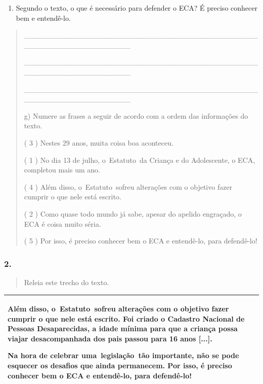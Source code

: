 \begin{enumerate}
\def\labelenumi{\alph{enumi})}
\item
  Segundo o texto, o que é necessário para defender o ECA? É preciso
  conhecer bem e entendê-lo.
\end{enumerate}

\begin{quote}
\_\_\_\_\_\_\_\_\_\_\_\_\_\_\_\_\_\_\_\_\_\_\_\_\_\_\_\_\_\_\_\_\_\_\_\_\_\_\_\_\_\_\_\_\_\_\_\_\_\_\_\_\_\_\_\_\_\_\_\_\_\_\_\_

\_\_\_\_\_\_\_\_\_\_\_\_\_\_\_\_\_\_\_\_\_\_\_\_\_\_\_\_\_\_\_\_\_\_\_\_\_\_\_\_\_\_\_\_\_\_\_\_\_\_\_\_\_\_\_\_\_\_\_\_\_\_\_\_

\_\_\_\_\_\_\_\_\_\_\_\_\_\_\_\_\_\_\_\_\_\_\_\_\_\_\_\_\_\_\_\_\_\_\_\_\_\_\_\_\_\_\_\_\_\_\_\_\_\_\_\_\_\_\_\_\_\_\_\_\_\_\_\_

g) Numere as frases a seguir de acordo com a ordem das informações do
texto.

( 3 ) Nestes 29 anos, muita coisa boa aconteceu.

( 1 ) No dia 13 de julho, o~Estatuto~da Criança e do Adolescente, o ECA,
completou mais um ano.

( 4 ) Além disso, o~Estatuto~sofreu alterações com o objetivo fazer
cumprir o que nele está escrito.

( 2 ) Como quase todo mundo já sabe, apesar do apelido engraçado, o ECA
é coisa muito séria.

( 5 ) Por isso, é preciso conhecer bem o ECA e entendê-lo, para
defendê-lo!
\end{quote}

\subsubsection{2. }\label{section-61}

\begin{quote}
Releia este trecho do texto.
\end{quote}

\begin{longtable}[]{@{}l@{}}
\toprule
\begin{minipage}[t]{0.97\columnwidth}\raggedright\strut
Além disso, o~Estatuto~sofreu alterações com o objetivo fazer cumprir o
que nele está escrito. Foi criado o Cadastro Nacional de Pessoas
Desaparecidas, a idade mínima para que a criança possa viajar
desacompanhada dos pais passou para 16 anos {[}...{]}.

Na hora de celebrar uma~legislação~tão importante, não se pode esquecer
os desafios que ainda permanecem. Por isso, é preciso conhecer bem o ECA
e entendê-lo, para defendê-lo!\strut
\end{minipage}\tabularnewline
\bottomrule
\end{longtable}

